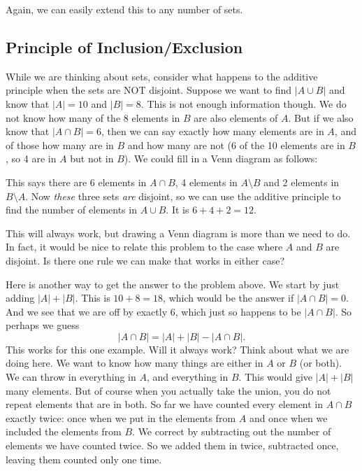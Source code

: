 \documentclass[12pt]{article}
\begin{document}
Again, we can easily extend this to any number of sets.

\subsection{Principle of Inclusion/Exclusion}\label{sec:PIE}

While we are thinking about sets, consider what happens to the additive principle when the sets are NOT disjoint. Suppose we want to find $|A \cup B|$ and know that $|A| = 10$ and $|B| = 8$.  This is not enough information though.  We do not know how many of the 8 elements in $B$ are also elements of $A$.  But if we also know that $|A \cap B| = 6$, then we can say exactly how many elements are in $A$, and of those how many are in $B$ and how many are not (6 of the 10 elements are in $B$, so 4 are in $A$ but not in $B$).  We could fill in a Venn diagram as follows:

\begin{center}



\end{center}

This says there are 6 elements in $A \cap B$, 4 elements in $A \setminus B$ and 2 elements in $B \setminus A$.  Now \emph{these} three sets \emph{are} disjoint, so we can use the additive principle to find the number of elements in $A \cup B$.  It is $6 + 4 + 2 = 12$.  

This will always work, but drawing a Venn diagram is more than we need to do.  In fact, it would be nice to relate this problem to the case where $A$ and $B$ are disjoint.  Is there one rule we can make that works in either case?

Here is another way to get the answer to the problem above.  We start by just adding $|A| + |B|$.  This is $10 + 8 = 18$, which would be the answer if $|A \cap B| = 0$.  And we see that we are off by exactly 6, which just so happens to be $|A \cap B|$.  So perhaps we guess
\[|A \cap B| = |A| + |B| - |A \cap B|.\]
This works for this one example.  Will it always work?  Think about what we are doing here.  We want to know how many things are either in $A$ or $B$ (or both).  We can throw in everything in $A$, and everything in $B$.  This would give $|A| + |B|$ many elements.  But of course when you actually take the union, you do not repeat elements that are in both.  So far we have counted every element in $A \cap B$ exactly twice: once when we put in the elements from $A$ and once when we included the elements from $B$.  We correct by subtracting out the number of elements we have counted twice.  So we added them in twice, subtracted once, leaving them counted only one time.
\end{document}
